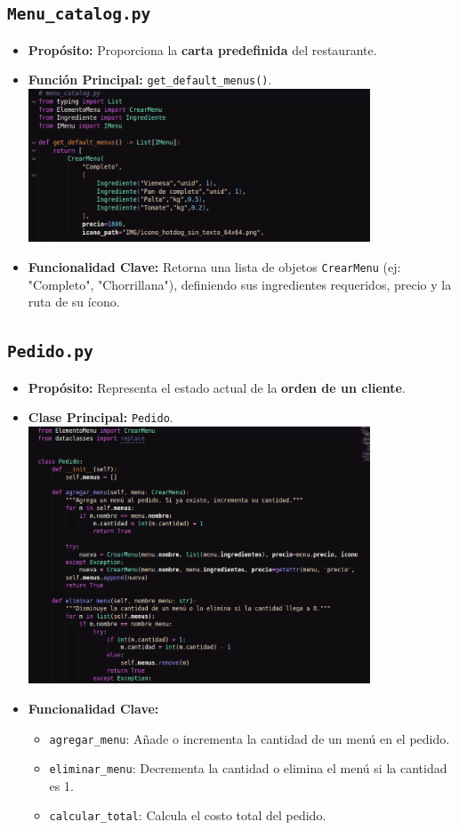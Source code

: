 \documentclass[a4paper, 12pt]{article}
\begin{document}
\subsection{\texttt{Menu\_catalog.py}}
\begin{itemize}
    \item \textbf{Propósito:} Proporciona la \textbf{carta predefinida} del restaurante.
    \item \textbf{Función Principal:} \texttt{get\_default\_menus()}.\\
\includegraphics[width=0.8\textwidth]{images/6.png}
    \item \textbf{Funcionalidad Clave:} Retorna una lista de objetos \texttt{CrearMenu} (ej: "Completo", "Chorrillana"), definiendo sus ingredientes requeridos, precio y la ruta de su ícono.
\end{itemize}

\subsection{\texttt{Pedido.py}}
\begin{itemize}
    \item \textbf{Propósito:} Representa el estado actual de la \textbf{orden de un cliente}.
    \item \textbf{Clase Principal:} \texttt{Pedido}.\\
\includegraphics[width=0.8\textwidth]{images/7.png}
    \item \textbf{Funcionalidad Clave:}
    \begin{itemize}
        \item \texttt{agregar\_menu}: Añade o incrementa la cantidad de un menú en el pedido.
        \item \texttt{eliminar\_menu}: Decrementa la cantidad o elimina el menú si la cantidad es 1.
        \item \texttt{calcular\_total}: Calcula el costo total del pedido.
    \end{itemize}
\end{itemize}
\newpage
\end{document}
